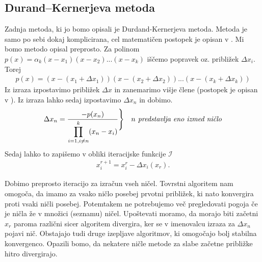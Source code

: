 \subsection{Durand–Kernerjeva metoda}
Zadnja metoda, ki jo bomo opisali je Durdand-Kernerjeva metoda. Metoda je samo po sebi dokaj komplicirana, cel matematičen postopek je opisan v \cite{Bohte_1993}. Mi bomo metodo opisal preprosto. Za polinom $p(x) = \alpha_k (x-x_1)(x-x_2)...(x-x_k)$ iščemo popravek oz. približek $\Delta x_i$. Torej
\begin{align}
    p(x) = (x-(x_1 + \Delta x_1))(x-(x_2 + \Delta x_2))...(x-(x_k + \Delta x_k)) 
\end{align}
Iz izraza izpostavimo približek $\Delta x$ in zanemarimo višje člene (postopek je opisan v \cite{Bohte_1993, Plestenjak2010}). Iz izraza lahko sedaj izpostavimo $\Delta x_n$ in dobimo.
\begin{equation}
    \Delta x_n = \frac{-p(x_n)}{\displaystyle \prod_{i=1, i \ne n}^k (x_n - x_i)} \Bigg \rbrace \quad \text{\textit{$n$ predstavlja eno izmed ničlo}}
\end{equation}
Sedaj lahko to zapišemo v obliki iteracijske funkcije $\mathcal{I}$
\begin{align}
    x_i^{r+1} = x_i^r - \Delta x_i(x_r).
\end{align}


Dobimo preprosto iteracijo za izračun vseh ničel. Tovrstni algoritem nam omogoča, da imamo za vsako ničlo posebej prvotni približek, ki nato konvergira proti vsaki ničli posebej. Potemtakem ne potrebujemo več pregledovati pogoja če je ničla že v množici (seznamu) ničel. 
Upoštevati moramo, da morajo biti začetni $x_r$ paroma različni sicer algoritem divergira, ker se v imenovalcu izraza za $\Delta x_n$ pojavi nič. Obstajajo tudi druge izepljave algoritmov, ki omogočajo bolj stabilna konvergenco. Opazili bomo, da nekatere ničle metode za slabe začetne približke hitro divergirajo.



